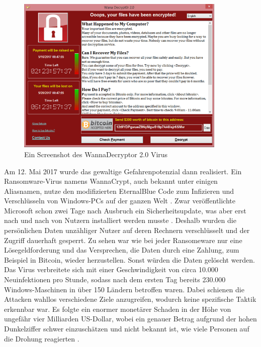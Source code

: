 \documentclass[DIV=12,headings=normal,pdftex,headinclude=false,footinclude=false,final]{scrreprt}
\begin{document}
\begin{figure}[H]
    \centering
    \includegraphics[width=10cm]{wanna_decrypt0r_2.0.png}
    \caption[WannaDecryptor Screenshot, URL: <https://securelist.com/   wannacry-ransomware-used-in-widespread-attacks-all-over-the-world/78351/>]{Ein Screenshot des  WannaDecryptor 2.0 Virus}
    \label{img:wanna_decrypt0r}
\end{figure}

\noindent
Am 12. Mai 2017 wurde das gewaltige Gefahrenpotenzial dann realisiert. Ein Ransomware-Virus namens WannaCrypt, auch bekannt unter einigen Aliasnamen, nutze den modifizierten EternalBlue Code zum Infizieren und Verschlüsseln von Windows-PCs auf der ganzen Welt \cite{Avast}. Zwar veröffentlichte Microsoft schon zwei Tage nach Ausbruch ein Sicherheitsupdate, was aber erst nach und nach von Nutzern installiert werden musste \cite{MSSB}. Deshalb wurden die persönlichen Daten unzähliger Nutzer auf deren Rechnern verschlüsselt und der Zugriff dauerhaft gesperrt. Zu sehen war wie bei jeder Ransomeware nur eine Lösegeldforderung und das Versprechen, die Daten durch eine Zahlung, zum Beispiel in Bitcoin, wieder herzustellen. Sonst würden die Daten gelöscht werden. Das Virus verbreitete sich mit einer Geschwindigkeit von circa 10.000 Neuinfektionen pro Stunde, sodass nach dem ersten Tag bereits 230.000 Windows-Maschinen in über 150 Ländern betroffen waren. Dabei schienen die Attacken wahllos verschiedene Ziele anzugreifen, wodurch keine spezifische Taktik erkennbar war. Es folgte ein enormer monetärer Schaden in der Höhe von ungefähr vier Milliarden US-Dollar, wobei ein genauer Betrag aufgrund der hohen Dunkelziffer schwer einzuschätzen und nicht bekannt ist, wie viele Personen auf die Drohung reagierten \cite{Avast}.
\end{document}
